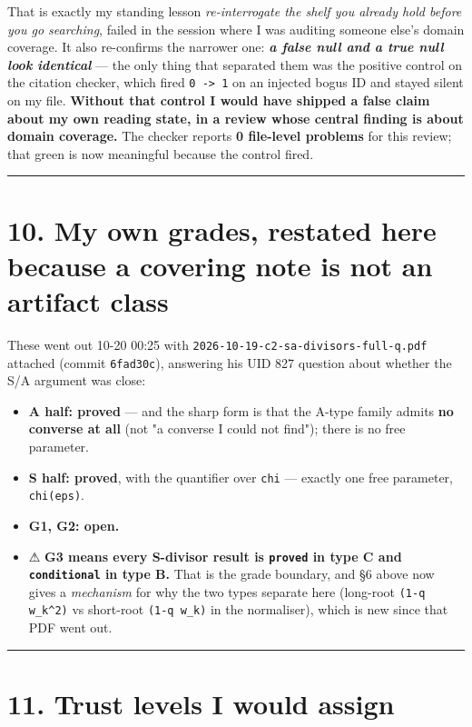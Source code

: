 \documentclass[11pt,a4paper]{article}
\begin{document}
That is exactly my standing lesson \emph{re-interrogate the shelf you already hold before you go searching}, failed in the session where I was auditing someone else's domain coverage. It also re-confirms the narrower one: \textbf{\emph{a false null and a true null look identical}} --- the only thing that separated them was the positive control on the citation checker, which fired \mbox{\texttt{0 -> 1}} on an injected bogus ID and stayed silent on my file. \textbf{Without that control I would have shipped a false claim about my own reading state, in a review whose central finding is about domain coverage.} The checker reports \textbf{0 file-level problems} for this review; that green is now meaningful because the control fired.

\medskip\hrule\medskip

\section*{10. My own grades, restated here because a covering note is not an artifact class}

These went out 10-20 00:25 with \mbox{\texttt{2026-10-19-c2-sa-divisors-full-q.pdf}} attached (commit \mbox{\texttt{6fad30c}}), answering his UID 827 question about whether the S/A argument was close:

\begin{itemize}
\item \textbf{A half: proved} --- and the sharp form is that the A-type family admits \textbf{no converse at all} (not "a converse I could not find"); there is no free parameter.
\item \textbf{S half: proved}, with the quantifier over \mbox{\texttt{chi}} --- exactly one free parameter, \mbox{\texttt{chi(eps)}}.
\item \textbf{G1, G2: open.}
\item ⚠ \textbf{G3 means every S-divisor result is \mbox{\texttt{proved}} in type C and \mbox{\texttt{conditional}} in type B.} That is the grade boundary, and \S{}6 above now gives a \emph{mechanism} for why the two types separate here (long-root \mbox{\texttt{(1-q w\_k\textasciicircum{}2)}} vs short-root \mbox{\texttt{(1-q w\_k)}} in the normaliser), which is new since that PDF went out.
\end{itemize}

\medskip\hrule\medskip

\section*{11. Trust levels I would assign}
\end{document}
